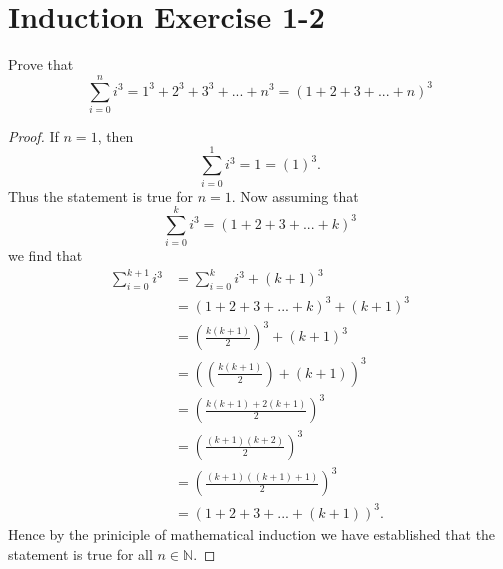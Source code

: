 \documentclass{article}
\begin{document}
\section*{Induction Exercise 1-2}
Prove that
\[
	\sum_{i=0}^{n} i^3 = 1^3 + 2^3 + 3^3 + ... + n^3 = (1+2+3+...+n)^3
\]
\begin{proof}
	If $n=1$, then
	\[
		\sum_{i=0}^{1} i^3 = 1 = (1)^3.
	\]
	Thus the statement is true for $n=1$.
	\newline\newline
	Now assuming that
	\[
		\sum_{i=0}^{k} i^3 = (1+2+3+...+k)^3
	\]
	we find that 
	\begin{align*}
		\sum_{i=0}^{k+1} i^3 & = \sum_{i=0}^{k} i^3 + (k+1)^3\\
				     & = (1+2+3+...+k)^3 + (k+1)^3 \\
				     & = \left( \frac{k(k+1)}{2} \right)^3 + (k+1)^3 \\
				     & = \left( \left( \frac{k(k+1)}{2} \right) + (k+1) \right)^3 \\
				     & = \left( \frac{k(k+1)+2(k+1)}{2} \right)^3 \\
				     & = \left( \frac{(k+1)(k+2)}{2} \right)^3 \\
				     & = \left( \frac{(k+1)((k+1)+1)}{2} \right)^3 \\
				     & = (1+2+3+...+(k+1))^3.
	\end{align*}
	Hence by the priniciple of mathematical induction we have established that the statement is true for all $n \in \mathbb{N}$.
\end{proof}
\end{document}
